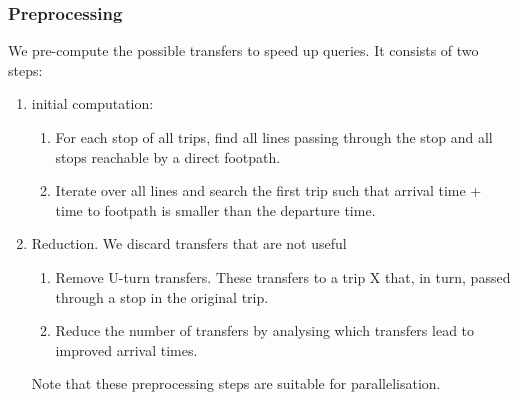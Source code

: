 \subsubsection{Preprocessing}
We pre-compute the possible transfers to speed up queries. It consists of two steps:
\begin{enumerate}
    \item initial computation: \begin{enumerate}
        \item For each stop of all trips, find all lines passing through the stop and all stops reachable by a direct footpath.
        \item Iterate over all lines and search the first trip such that arrival time + time to footpath is smaller than the departure time.
    \end{enumerate}
    \item Reduction. We discard transfers that are not useful \begin{enumerate}
        \item Remove U-turn transfers. These transfers to a trip X that, in turn, passed through a stop in the original trip.
        \item Reduce the number of transfers by analysing which transfers lead to improved arrival times.
    \end{enumerate}

Note that these preprocessing steps are suitable for parallelisation.
\end{enumerate}
